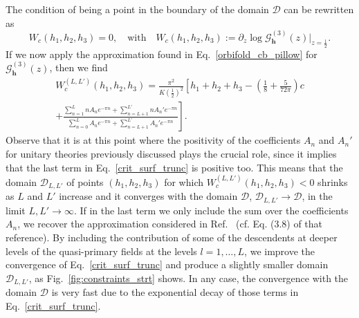 \documentclass[a4paper,11pt]{article}
\begin{document}
The condition of being a point in the boundary of  the domain $\mathscr{D}$
can be rewritten as
\begin{equation}
 W_c(h_1, h_2, h_3)=0,\quad \text{with}\quad 
 W_c(h_1, h_2, h_3):=\partial_z\log\mathcal{G}_{\boldsymbol{h}}^{(3)}(z)\Bigr|_{z=\frac{1}{2}}.
\end{equation}
If we now apply the approximation found in Eq.~\eqref{orbifold_cb_pillow} for 
$\mathcal{G}_{\boldsymbol{h}}^{(3)}(z)$, then we find
\begin{multline}\label{crit_surf_trunc}
 W_c^{(L, L')}(h_1, h_2, h_3)=
 \frac{\pi^2}{K(\frac{1}{2})^2}
 \left[h_1+h_2+h_3-\left(\frac{1}{8}+\frac{5}{72\pi}\right)c\right. \\
 \left.+\frac{\sum_{n=1}^L n A_n e^{-\pi n}+\sum_{n=L+1}^{L'} n A_n'e^{-\pi n}}
 {\sum_{n=0}^L A_n e^{-\pi n}+\sum_{n=L+1}^{L'} A_n' e^{-\pi n}}\right]. 
\end{multline}
Observe that it is at this point where the positivity of the coefficients $A_n$ 
and $A_n'$ for unitary theories previously discussed plays the crucial role, since 
it implies that the last term in Eq.~\eqref{crit_surf_trunc} is positive too. This means that the 
domain $\mathscr{D}_{L, L'}$ of points $(h_1, h_2, h_3)$ for which $W_c^{(L, L')}(h_1, h_2, h_3)<0$
shrinks as $L$ and $L'$ increase and it converges with the domain $\mathscr{D}$, $\mathscr{D}_{L, L'}\to\mathscr{D}$,
in the limit $L, L'\to\infty$. If in the last term we only include the sum over the coefficients 
$A_n$, we recover the approximation considered in Ref.~\cite{Collier} (cf. Eq. (3.8) of that reference). 
By including the contribution of some of the descendents at deeper levels of the quasi-primary fields at 
the levels $l=1, \dots, L$, we improve the convergence of Eq.~\eqref{crit_surf_trunc} and produce a slightly smaller domain 
$\mathscr{D}_{L, L'}$, as Fig.~\ref{fig:constraints_strt} shows. In any case, the convergence with the domain $\mathscr{D}$ is 
very fast due to the exponential decay of those terms in Eq.~\eqref{crit_surf_trunc}.
\end{document}

